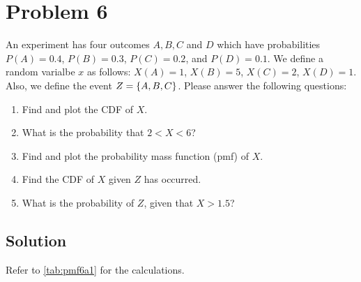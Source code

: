 \section{Problem 6}
An experiment has four outcomes $A, B, C $ and $D$ which have probabilities $P(A)=0.4$, $P(B)=0.3$, $P(C)=0.2$, and $P(D)=0.1$. We define a random varialbe $x$ as follows: $X(A) = 1$, $X(B) = 5$, $X(C) = 2$, $X(D) = 1$. Also, we define the event $Z = \{A, B, C\}$. Please answer the following questions:

\begin{enumerate}[6a.]
	\item Find and plot the CDF of $X$.
	\item What is the probability that $2<X<6$?
	\item Find and plot the probability mass function (pmf) of $X$.
	\item Find the CDF of $X$ given $Z$ has occurred.
	\item What is the probability of $Z$, given that $X>1.5$?
\end{enumerate}

\subsection{Solution}
Refer to \cref{tab:pmf6a1} for the calculations.

